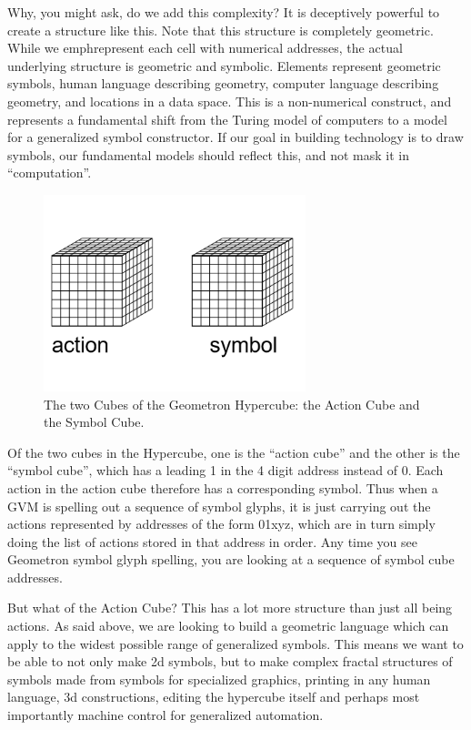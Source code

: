 Why, you might ask, do we add this complexity?  It is deceptively powerful to create a structure like this.  Note that this structure is completely geometric.  While we emph{represent} each cell with numerical addresses, the actual underlying structure is geometric and symbolic.  Elements represent geometric symbols, human language describing geometry, computer language describing geometry,  and locations in a data space.  This is a non-numerical construct, and represents a fundamental shift from the Turing model of computers to a model for a generalized symbol constructor.  If our goal in building technology is to draw symbols, our fundamental models should reflect this, and not mask it in ``computation''.  

\begin{figure}
	\centering
	\includegraphics[width=3in]{figures/symbol/cubes.png}
	\caption[cubes]
	{The two Cubes of the Geometron Hypercube: the Action Cube and the Symbol Cube.}
\end{figure}


Of the two cubes in the Hypercube, one is the ``action cube'' and the other is the ``symbol cube'', which has a leading 1 in the 4 digit address instead of 0.  Each action in the action cube therefore has a corresponding symbol.  Thus when a GVM is spelling out a sequence of symbol glyphs, it is just carrying out the actions represented by addresses of the form 01xyz, which are in turn simply doing the list of actions stored in that address in order.  Any time you see Geometron symbol glyph spelling, you are looking at a sequence of symbol cube addresses.

But what of the Action Cube?  This has a lot more structure than just all being actions.  As said above, we are looking to build a geometric language which can apply to the widest possible range of generalized symbols. This means we want to be able to not only make 2d symbols, but to make complex fractal structures of symbols made from symbols for specialized graphics, printing in any human language, 3d constructions, editing the hypercube itself and perhaps most importantly machine control for generalized automation.


